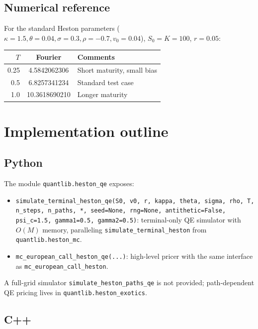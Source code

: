 \documentclass[11pt]{article}
\theoremstyle{plain}
\theoremstyle{definition}
\theoremstyle{remark}
\begin{document}
\subsection{Numerical reference}

For the standard Heston parameters ($\kappa = 1.5, \theta = 0.04, \sigma = 0.3, \rho = -0.7, v_0 = 0.04$), $S_0 = K = 100$, $r = 0.05$:

\begin{center}
\begin{tabular}{rcl}
\toprule
$T$ & Fourier & Comments \\
\midrule
0.25 & 4.5842062306 & Short maturity, small bias \\
0.5  & 6.8257341234 & Standard test case \\
1.0  & 10.3618690210 & Longer maturity \\
\bottomrule
\end{tabular}
\end{center}

\section{Implementation outline}

\subsection{Python}

The module \texttt{quantlib.heston\_qe} exposes:

\begin{itemize}[topsep=2pt]
    \item \texttt{simulate\_terminal\_heston\_qe(S0, v0, r, kappa, theta, sigma, rho, T, n\_steps, n\_paths, *, seed=None, rng=None, antithetic=False, psi\_c=1.5, gamma1=0.5, gamma2=0.5)}: terminal-only QE simulator with $O(M)$ memory, paralleling \texttt{simulate\_terminal\_heston} from \texttt{quantlib.heston\_mc}.
    \item \texttt{mc\_european\_call\_heston\_qe(...)}: high-level pricer with the same interface as \texttt{mc\_european\_call\_heston}.
\end{itemize}
A full-grid simulator \texttt{simulate\_heston\_paths\_qe} is not provided; path-dependent QE pricing lives in \texttt{quantlib.heston\_exotics}.

\subsection{C++}
\end{document}
